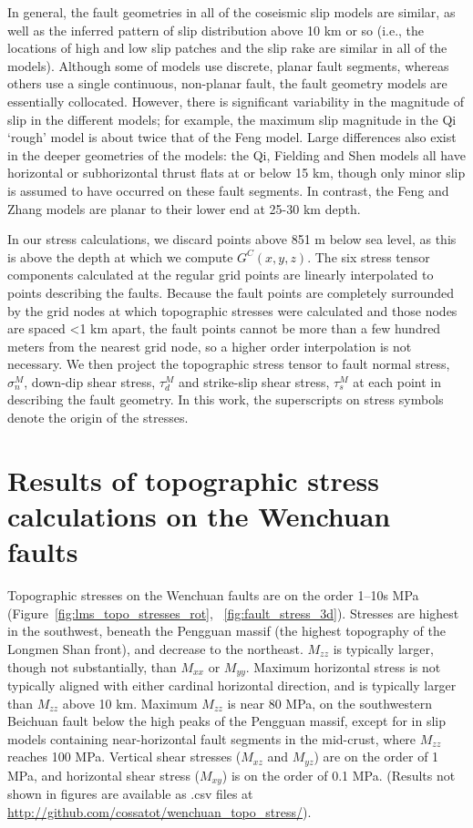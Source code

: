 \documentclass[draft,jgrga]{AGUTeX}
\begin{document}
\begin{article}
In general, the fault geometries in all of the coseismic slip models are
similar, as well as the inferred pattern of slip distribution above 10 km or
so (i.e., the locations of high and low slip patches and the slip rake are
similar in all of the models).  Although some of models use discrete, planar
fault segments, whereas others use a single continuous, non-planar fault, the
fault geometry models are essentially collocated. However, there is significant
variability in the magnitude of slip in the different models; for example, the
maximum slip magnitude in the Qi `rough' model is about twice that of the
Feng model. Large differences also exist in the deeper geometries of the
models: the Qi, Fielding and Shen models all have horizontal or subhorizontal
thrust flats at or below 15 km, though only minor slip is assumed to have
occurred on these fault segments. In contrast, the Feng and Zhang models are
planar to their lower end at 25-30 km depth.

In our stress calculations, we discard
points above 851 m below sea level, as this is above the depth at which
we compute $G^C(x,y,z)$. The six stress tensor components calculated at
the regular grid points are linearly interpolated to points describing
the faults. Because the fault points are completely surrounded by the
grid nodes at which topographic stresses were calculated and those nodes
are spaced \textless{}1 km apart, the fault points cannot be more than a
few hundred meters from the nearest grid node, so a higher order
interpolation is not necessary. We then project the topographic stress
tensor to fault normal stress, $\sigma_n^M$, down-dip shear stress,
$\tau_d^M$ and strike-slip shear stress, $\tau_s^M$ at each point in
describing the fault geometry. In this work, the superscripts on stress
symbols denote the origin of the stresses.

\section{Results of topographic stress calculations on the Wenchuan
faults}\label{results-of-topographic-stress-calculations-on-the-wenchuan-faults}

Topographic stresses on the Wenchuan faults are on the order 1--10s MPa
(Figure~\ref{fig:lms_topo_stresses_rot}, ~\ref{fig:fault_stress_3d}). 
Stresses are highest in the southwest,
beneath the Pengguan massif (the highest topography of the Longmen Shan
front), and decrease to the northeast. $M_{zz}$ is typically larger,
though not substantially, than $M_{xx}$ or $M_{yy}$. Maximum horizontal
stress is not typically aligned with either cardinal horizontal
direction, and is typically larger than $M_{zz}$ above 10 km. Maximum
$M_{zz}$ is near 80 MPa, on the southwestern Beichuan fault below the
high peaks of the Pengguan massif, except for in slip models containing
near-horizontal fault segments in the mid-crust, where $M_{zz}$ reaches
100 MPa. Vertical shear stresses ($M_{xz}$ and $M_{yz}$) are on the
order of 1 MPa, and horizontal shear stress ($M_{xy}$) is on the order
of 0.1 MPa. (Results not shown in figures are available as .csv files
at \url{http://github.com/cossatot/wenchuan_topo_stress/}).


\end{article}
\end{document}
